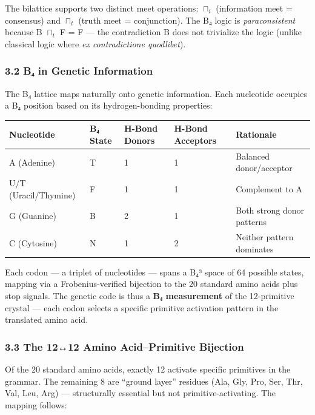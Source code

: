The bilattice supports two distinct meet operations: \(\sqcap_i\)
(information meet = consensus) and \(\sqcap_t\) (truth meet =
conjunction). The B₄ logic is \emph{paraconsistent} because B
\(\sqcap_t\) F = F --- the contradiction B does not trivialize the logic
(unlike classical logic where \emph{ex contradictione quodlibet}).

\hypertarget{bux2084-in-genetic-information}{%
\subsubsection{3.2 B₄ in Genetic
Information}\label{bux2084-in-genetic-information}}

The B₄ lattice maps naturally onto genetic information. Each nucleotide
occupies a B₄ position based on its hydrogen-bonding properties:

\begin{longtable}[]{@{}lllll@{}}
\toprule
Nucleotide & B₄ State & H-Bond Donors & H-Bond Acceptors &
Rationale\tabularnewline
\midrule
\endhead
A (Adenine) & T & 1 & 1 & Balanced donor/acceptor\tabularnewline
U/T (Uracil/Thymine) & F & 1 & 1 & Complement to A\tabularnewline
G (Guanine) & B & 2 & 1 & Both strong donor patterns\tabularnewline
C (Cytosine) & N & 1 & 2 & Neither pattern dominates\tabularnewline
\bottomrule
\end{longtable}

Each codon --- a triplet of nucleotides --- spans a B₄³ space of 64
possible states, mapping via a Frobenius-verified bijection to the 20
standard amino acids plus stop signals. The genetic code is thus a
\textbf{B₄ measurement} of the 12-primitive crystal --- each codon
selects a specific primitive activation pattern in the translated amino
acid.

\hypertarget{the-1212-amino-acidprimitive-bijection}{%
\subsubsection{3.3 The 12↔12 Amino Acid--Primitive
Bijection}\label{the-1212-amino-acidprimitive-bijection}}

Of the 20 standard amino acids, exactly 12 activate specific primitives
in the grammar. The remaining 8 are ``ground layer'' residues (Ala, Gly,
Pro, Ser, Thr, Val, Leu, Arg) --- structurally essential but not
primitive-activating. The mapping follows:

